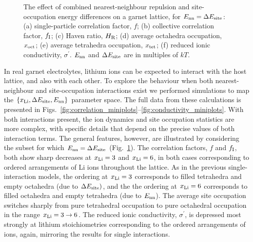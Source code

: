 \documentclass[aps,prb,twocolumn,superscriptaddress,reprint]{revtex4-1}
\newcommand{\xLi}{x_\m{Li}}
\begin{document}
\begin{figure}[tb]
  \centering
    \caption{\label{fig:both_energies_data}The effect of combined nearest-neighbour repulsion and site-occupation energy differences on a garnet lattice, for $E_{\mathrm{nn}}=\Delta E_{\mathrm{site}}$: (a) single-particle correlation factor, $f$; (b) collective correlation factor, $f_{\mathrm{I}}$; (c) Haven ratio, $H_{\mathrm{R}}$; (d) average octahedra occupation, $x_{\mathrm{oct}}$; (e) average tetrahedra occupation, $x_{\mathrm{tet}}$; (f) reduced ionic conductivity, $\sigma^\prime$. $E_{\mathrm{nn}}$ and $\Delta E_{\mathrm{site}}$ are in multiples of $kT$.}
\end{figure}

In real garnet electrolytes, lithium ions can be expected to interact with the host lattice, and also with each other. To explore the behaviour when both nearest-neighbour and site-occupation interactions exist we performed simulations to map the $\left\{\xLi, \Delta E_\m{site}, E_\m{nn}\right\}$ parameter space. 
The full data from these calculations is presented in Figs.~\ref{fig:correlation_miniplots}--\ref{fig:conductivity_miniplots}. With both interactions present, the ion dynamics and site occupation statistics are  more complex, with specific details that depend on the precise values of both interaction terms. The general features, however, are illustrated by considering the subset for which $E_{\mathrm{nn}}=\Delta E_{\mathrm{site}}$ (Fig.~\ref{fig:both_energies_data}). The correlation factors, $f$ and $f_{\mathrm{I}}$, both show sharp decreases at $\xLi=3$ and $\xLi=6$, in both cases corresponding to ordered arrangements of Li ions throughout the lattice. As in the previous single-interaction models, the ordering at $\xLi=3$ corresponds to filled tetrahedra and empty octahedra (due to $\Delta E_{\mathrm{site}})$, and the the ordering at $\xLi=6$ corresponds to filled octahedra and empty tetrahedra (due to $E_{\mathrm{nn}}$). The average site occupation switches sharply from pure tetrahedral occupation to pure octahedral occupation in the range $\xLi=3\to6$. The reduced ionic conductivity, $\sigma^\prime$, is depressed most strongly at lithium stoichiometries corresponding to the ordered arrangements of ions, again, mirroring the results for single interactions. 
\end{document}
